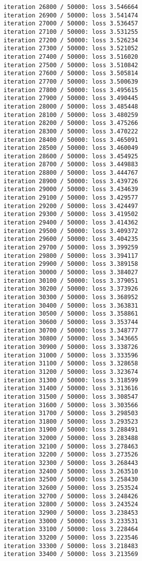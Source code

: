 \documentclass[11pt]{article}
\begin{document}
\begin{Verbatim}[commandchars=\\\{\}]
iteration 26800 / 50000: loss 3.546664
iteration 26900 / 50000: loss 3.541474
iteration 27000 / 50000: loss 3.536457
iteration 27100 / 50000: loss 3.531255
iteration 27200 / 50000: loss 3.526234
iteration 27300 / 50000: loss 3.521052
iteration 27400 / 50000: loss 3.516020
iteration 27500 / 50000: loss 3.510842
iteration 27600 / 50000: loss 3.505814
iteration 27700 / 50000: loss 3.500639
iteration 27800 / 50000: loss 3.495615
iteration 27900 / 50000: loss 3.490445
iteration 28000 / 50000: loss 3.485448
iteration 28100 / 50000: loss 3.480259
iteration 28200 / 50000: loss 3.475266
iteration 28300 / 50000: loss 3.470222
iteration 28400 / 50000: loss 3.465091
iteration 28500 / 50000: loss 3.460049
iteration 28600 / 50000: loss 3.454925
iteration 28700 / 50000: loss 3.449883
iteration 28800 / 50000: loss 3.444767
iteration 28900 / 50000: loss 3.439726
iteration 29000 / 50000: loss 3.434639
iteration 29100 / 50000: loss 3.429577
iteration 29200 / 50000: loss 3.424497
iteration 29300 / 50000: loss 3.419502
iteration 29400 / 50000: loss 3.414362
iteration 29500 / 50000: loss 3.409372
iteration 29600 / 50000: loss 3.404235
iteration 29700 / 50000: loss 3.399259
iteration 29800 / 50000: loss 3.394117
iteration 29900 / 50000: loss 3.389158
iteration 30000 / 50000: loss 3.384027
iteration 30100 / 50000: loss 3.379051
iteration 30200 / 50000: loss 3.373926
iteration 30300 / 50000: loss 3.368952
iteration 30400 / 50000: loss 3.363831
iteration 30500 / 50000: loss 3.358861
iteration 30600 / 50000: loss 3.353744
iteration 30700 / 50000: loss 3.348777
iteration 30800 / 50000: loss 3.343665
iteration 30900 / 50000: loss 3.338726
iteration 31000 / 50000: loss 3.333596
iteration 31100 / 50000: loss 3.328658
iteration 31200 / 50000: loss 3.323674
iteration 31300 / 50000: loss 3.318599
iteration 31400 / 50000: loss 3.313616
iteration 31500 / 50000: loss 3.308547
iteration 31600 / 50000: loss 3.303566
iteration 31700 / 50000: loss 3.298503
iteration 31800 / 50000: loss 3.293523
iteration 31900 / 50000: loss 3.288491
iteration 32000 / 50000: loss 3.283488
iteration 32100 / 50000: loss 3.278463
iteration 32200 / 50000: loss 3.273526
iteration 32300 / 50000: loss 3.268443
iteration 32400 / 50000: loss 3.263510
iteration 32500 / 50000: loss 3.258430
iteration 32600 / 50000: loss 3.253524
iteration 32700 / 50000: loss 3.248426
iteration 32800 / 50000: loss 3.243524
iteration 32900 / 50000: loss 3.238453
iteration 33000 / 50000: loss 3.233531
iteration 33100 / 50000: loss 3.228464
iteration 33200 / 50000: loss 3.223546
iteration 33300 / 50000: loss 3.218483
iteration 33400 / 50000: loss 3.213569

\end{Verbatim}
\end{document}
